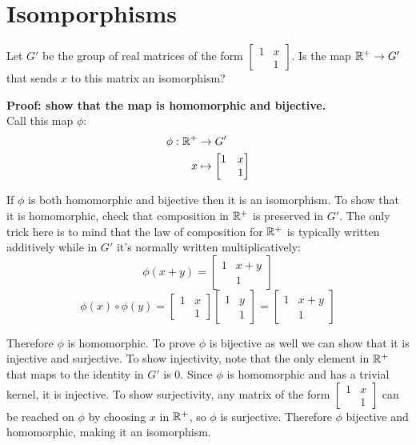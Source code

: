 \documentclass{article}
\begin{document}
\section{Isomporphisms}
\begin{problem}
Let $G'$ be the group of real matrices of the form $\begin{bmatrix} 1 & x \\ & 1\end{bmatrix}$. Is the map $\mathbb{R}^+ \to G'$ that sends $x$ to this matrix an isomorphism?
\end{problem}

\textbf{Proof: show that the map is homomorphic and bijective.}
\\
Call this map $\phi$:
\begin{align*}
    \phi: \mathbb{R}^+ & \to G'                             \\
    x          & \mapsto \begin{bmatrix} 1 & x \\ & 1\end{bmatrix}
\end{align*}

If $\phi$ is both homomorphic and bijective then it is an isomorphism. To show that it is homomorphic, check that composition in $\mathbb{R}^+$ is preserved in $G'$. The only trick here is to mind that the law of composition for $\mathbb{R}^+$ is typically written additively while in $G'$ it's normally written multiplicatively:
$$\phi(x + y) = \begin{bmatrix} 1 & x + y \\ & 1\end{bmatrix}$$
$$\phi(x)\circ\phi(y) = \begin{bmatrix} 1 & x \\ & 1\end{bmatrix}\begin{bmatrix} 1 & y \\ & 1\end{bmatrix} = \begin{bmatrix} 1 & x + y \\ & 1\end{bmatrix}$$

Therefore $\phi$ is homomorphic. To prove $\phi$ is bijective as well we can show that it is injective and surjective. To show injectivity, note that the only element in $\mathbb{R}^+$ that maps to the identity in $G'$ is 0. Since $\phi$ is homomorphic and has a trivial kernel, it is injective. To show surjectivity, any matrix of the form $\begin{bmatrix} 1 & x \\ & 1\end{bmatrix}$ can be reached on $\phi$ by choosing $x$ in $\mathbb{R}^+$, so $\phi$ is surjective. Therefore $\phi$ bijective and homomorphic, making it an isomorphism.
\end{document}
